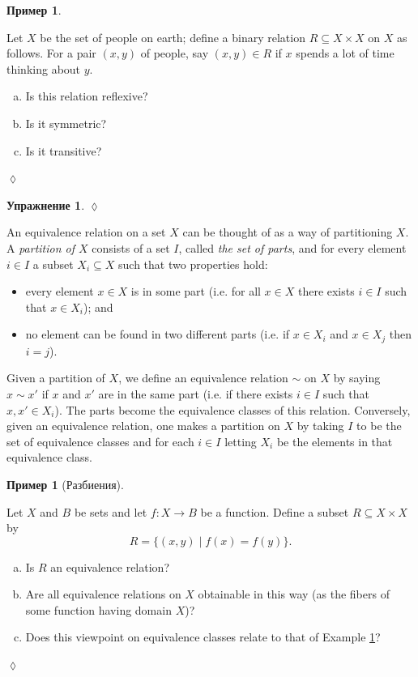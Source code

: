 \documentclass[a4paper]{book}
\def\to{\rightarrow}
\def\taking{\colon}
\def\ss{\subseteq}
\def\|{{\;|\;}}
\theoremstyle{myth}
\newtheorem{exampleENG}[envENG]{\begin{english}Example\end{english}}
\newtheorem{excENG}[envENG]{\begin{english}Exercise\end{english}}
\newenvironment{exerciseENG}{\begin{excENG}}{\hspace*{\fill}$\lozenge$\end{excENG}}
\newtheorem{exampleRUS}[envRUS]{Пример}
\newtheorem{excRUS}[envRUS]{Упражнение}
\newenvironment{exerciseRUS}{\begin{excRUS}}{\hspace*{\fill}$\lozenge$\end{excRUS}}
\def\sexc{\begin{enumerate}[a.)]\setlength{\itemsep}{.1cm}\setlength{\parskip}{.1cm}\item}
\def\next{\item}
\def\endsexc{\end{enumerate}}
\begin{document}
\begin{russian}
\begin{exampleRUS}
\end{exampleRUS}

\begin{exerciseENG}
Let $X$ be the set of people on earth; define a binary relation $R\ss X\times X$ on $X$ as follows. For a pair $(x,y)$ of people, say $(x,y)\in R$ if $x$ spends a lot of time thinking about $y$. 
\sexc Is this relation reflexive? 
\next Is it symmetric? 
\next Is it transitive?
\endsexc
\end{exerciseENG}

\begin{exerciseRUS}
 
\end{exerciseRUS}

\begin{exampleENG}[Partitions]\label{ex:partition}
An equivalence relation on a set $X$ can be thought of as a way of partitioning $X$. A {\em partition of $X$} consists of a set $I$, called {\em the set of parts}, and for every element $i\in I$ a subset $X_i\ss X$ such that two properties hold:
\begin{itemize}
\item every element $x\in X$ is in some part (i.e. for all $x\in X$ there exists $i\in I$ such that $x\in X_i$); and
\item no element can be found in two different parts (i.e. if $x\in X_i$ and $x\in X_j$ then $i=j$).
\end{itemize}

Given a partition of $X$, we define an equivalence relation $\sim$ on $X$ by saying $x\sim x'$ if $x$ and $x'$ are in the same part (i.e. if there exists $i\in I$ such that $x,x'\in X_i$). The parts become the equivalence classes of this relation. Conversely, given an equivalence relation, one makes a partition on $X$ by taking $I$ to be the set of equivalence classes and for each $i\in I$ letting $X_i$ be the elements in that equivalence class.
\end{exampleENG}

\begin{exampleRUS}[Разбиения]\label{ex:partition}
 
\end{exampleRUS}

\begin{exerciseENG}
Let $X$ and $B$ be sets and let $f\taking X\to B$ be a function. Define a subset $R\ss X\times X$ by $$R=\{(x,y)\|f(x)=f(y)\}.$$ 
\sexc Is $R$ an equivalence relation? 
\next Are all equivalence relations on $X$ obtainable in this way (as the fibers of some function having domain $X$)?
\next Does this viewpoint on equivalence classes relate to that of Example \ref{ex:partition}?
\endsexc
\end{exerciseENG}


\end{russian}
\end{document}
